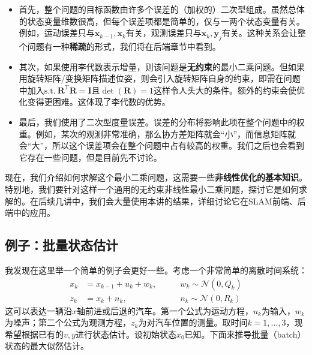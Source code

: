 \begin{itemize}
	\item 首先，整个问题的目标函数由许多个误差的（加权的）二次型组成。虽然总体的状态变量维数很高，但每个误差项都是简单的，仅与一两个状态变量有关。例如，运动误差只与$\bm{x}_{k-1}, \bm{x}_k$有关，观测误差只与$\bm{x}_k, \bm{y}_j$有关。这种关系会让整个问题有一种\textbf{稀疏}的形式，我们将在后端章节中看到。
	
	\item 其次，如果使用李代数表示增量，则该问题是\textbf{无约束}的最小二乘问题。但如果用旋转矩阵/变换矩阵描述位姿，则会引入旋转矩阵自身的约束，即需在问题中加入$\mathrm{s.t.}\ \bm{R}^\mathrm{T} \bm{R}=\bm{I} \text{且} \det (\bm{R})=1$这样令人头大的条件。额外的约束会使优化变得更困难。这体现了李代数的优势。
	
	\item 最后，我们使用了二次型度量误差。误差的分布将影响此项在整个问题中的权重。例如，某次的观测非常准确，那么协方差矩阵就会“小”，而信息矩阵就会“大”，所以这个误差项会在整个问题中占有较高的权重。我们之后也会看到它存在一些问题，但是目前先不讨论。
\end{itemize}

现在，我们介绍如何求解这个最小二乘问题，这需要一些\textbf{非线性优化的基本知识}。特别地，我们要针对这样一个通用的无约束非线性最小二乘问题，探讨它是如何求解的。在后续几讲中，我们会大量使用本讲的结果，详细讨论它在SLAM前端、后端中的应用。

\subsection{例子：批量状态估计}
我发现在这里举一个简单的例子会更好一些。考虑一个非常简单的离散时间系统：
\begin{equation}
\begin{array}{lll}
{x_k} &= {x_{k - 1}} + {u_k} + {w_k},&\qquad w_k \sim \mathcal{N}\left( {0,Q_k} \right)\\
{z_k} &= {x_k} + {n_k},&\qquad {n_k}\sim \mathcal{N}\left( {0,R_k} \right)
\end{array}
\end{equation}
这可以表达一辆沿$x$轴前进或后退的汽车。第一个公式为运动方程，$u_k$为输入，$w_k$为噪声；第二个公式为观测方程，$z_k$为对汽车位置的测量。取时间$k=1,\ldots,3$，现希望根据已有的$v,y$进行状态估计。设初始状态$x_0$已知。下面来推导批量（batch）状态的最大似然估计。

